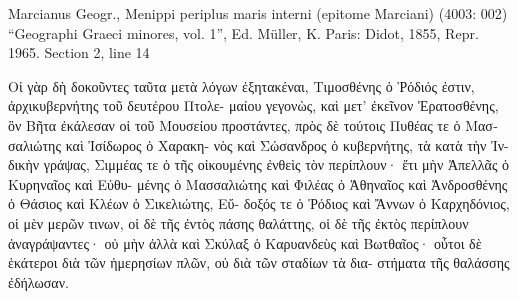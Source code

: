 \documentclass[12pt,letterpaper,twoside,final]{memoir}
\begin{document}
\begin{greek}
Marcianus Geogr., Menippi periplus maris interni (epitome Marciani) (4003: 002)
“Geographi Graeci minores, vol. 1”, Ed. Müller, K.
Paris: Didot, 1855, Repr. 1965.
Section 2, line 14

                                              Οἱ γὰρ δὴ 
δοκοῦντες ταῦτα μετὰ λόγων ἐξητακέναι, Τιμοσθένης 
ὁ Ῥόδιός ἐστιν, ἀρχικυβερνήτης τοῦ δευτέρου Πτολε-
μαίου γεγονὼς, καὶ μετ' ἐκεῖνον Ἐρατοσθένης, ὃν Βῆτα 
ἐκάλεσαν οἱ τοῦ Μουσείου προστάντες, πρὸς δὲ τούτοις 
Πυθέας τε ὁ Μασσαλιώτης καὶ Ἰσίδωρος ὁ Χαρακη-
νὸς καὶ Σώσανδρος ὁ κυβερνήτης, τὰ κατὰ τὴν Ἰν-
δικὴν γράψας, Σιμμέας τε ὁ τῆς οἰκουμένης ἐνθεὶς τὸν 
περίπλουν· ἔτι μὴν Ἀπελλᾶς ὁ Κυρηναῖος καὶ Εὐθυ-
μένης ὁ Μασσαλιώτης καὶ Φιλέας ὁ Ἀθηναῖος καὶ 
Ἀνδροσθένης ὁ Θάσιος καὶ Κλέων ὁ Σικελιώτης, Εὔ-
δοξός τε ὁ Ῥόδιος καὶ Ἄννων ὁ Καρχηδόνιος, οἱ μὲν 
μερῶν τινων, οἱ δὲ τῆς ἐντὸς πάσης θαλάττης, οἱ δὲ 
τῆς ἐκτὸς περίπλουν ἀναγράψαντες· οὐ μὴν ἀλλὰ καὶ 
Σκύλαξ ὁ Καρυανδεὺς καὶ Βωτθαῖος· οὗτοι δὲ ἑκάτεροι   
διὰ τῶν ἡμερησίων πλῶν, οὐ διὰ τῶν σταδίων τὰ δια-
στήματα τῆς θαλάσσης ἐδήλωσαν. 

\end{greek}
\end{document}

